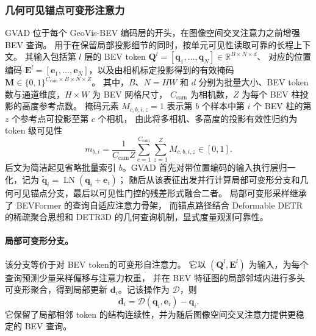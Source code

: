\documentclass[a4paper,fleqn]{cas-sc}
\newcommand{\R}{\mathbb{R}}
\begin{document}
\subsubsection{几何可见锚点可变形注意力}\label{sec:gvad}
GVAD 位于每个 GeoVis-BEV 编码层的开头，在图像空间交叉注意力之前增强 BEV 查询。
用于在保留局部投影细节的同时，按单元可见性读取可靠的长程上下文。
其输入包括第 $l$ 层的 BEV token $\bm{Q}^{l}=[\bm{q}_1,\ldots,\bm{q}_{N}]\in\R^{B\times N\times d}$、
对应的位置编码 $\bm{E}^{l}=[\bm{e}_1,\ldots,\bm{e}_{N}]$，以及由相机标定投影得到的有效掩码
$\bm{M}\in\{0,1\}^{C_{\mathrm{cam}}\times B\times N\times Z}$。
其中，$B$、$N=HW$ 和 $d$ 分别为批量大小、BEV token 数与通道维度，$H\times W$ 为 BEV 网格尺寸，
$C_{\mathrm{cam}}$ 为相机数，$Z$ 为每个 BEV 柱投影的高度参考点数。
掩码元素 $M_{c,b,i,z}=1$ 表示第 $b$ 个样本中第 $i$ 个 BEV 柱的第 $z$ 个参考点可投影至第 $c$ 个相机，
由此将多相机、多高度的投影有效性归约为 token 级可见性
\begin{equation}
m_{b,i}=\frac{1}{C_{\mathrm{cam}}Z}\sum_{c=1}^{C_{\mathrm{cam}}}\sum_{z=1}^{Z}M_{c,b,i,z}\in[0,1].
\end{equation}
后文为简洁起见省略批量索引 $b$。GVAD 首先对带位置编码的输入执行层归一化，记为
$\tilde{\bm{q}}_i=\operatorname{LN}(\bm{q}_i+\bm{e}_i)$；
随后从该表征出发并行计算局部可变形分支和几何可见锚点分支，最后以可见性门控的残差形式融合二者。
局部可变形采样继承了 BEVFormer 的查询自适应注意力骨架\citep{li2022bevformer}，
而锚点路径结合 Deformable DETR\citep{zhu2021deformable} 的稀疏聚合思想和
 DETR3D\citep{wang2022detr3d} 的几何查询机制，显式度量观测可靠性。

\paragraph{局部可变形分支。}
该分支等价于对 BEV token的可变形自注意力。
它以 $(\bm{Q}^{l},\bm{E}^{l})$ 为输入，为每个查询预测少量采样偏移与注意力权重，
并在 BEV 特征图的局部邻域内进行多头可变形聚合，得到局部更新 $\bm{d}_i$。记该操作为 $\mathcal{D}$，则
\begin{equation}
\bm{d}_i=\mathcal{D}(\bm{q}_i,\bm{e}_i)-\bm{q}_i.
\end{equation}
它保留了局部相邻 token 的结构连续性，并为随后图像空间交叉注意力提供更稳定的 BEV 查询。
\end{document}

